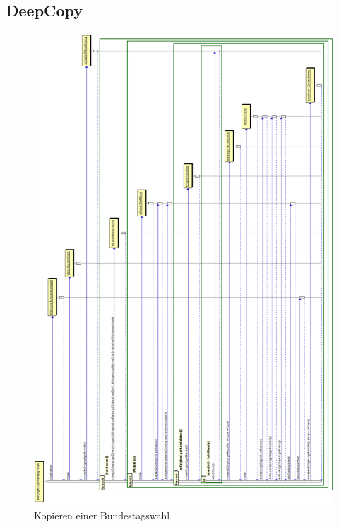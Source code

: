 \documentclass[12pt,a4paper,titlepage]{article}
\begin{document}
\subsection{DeepCopy}
\begin{figure}[!ht]
\includegraphics[scale=0.3]{DeepCopy.png} \caption{Kopieren einer Bundestagswahl} 
\end{figure}
\end{document}
